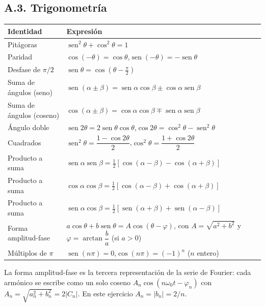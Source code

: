 \documentclass[11pt,a4paper]{article}
\DeclareMathOperator{\sen}{sen}
\begin{document}
\subsection*{A.3. Trigonometría}
\begin{table}[H]
\centering
\renewcommand{\arraystretch}{1.5}
\begin{tabularx}{\textwidth}{>{\raggedright\arraybackslash}p{4.4cm}X}
\toprule
\textbf{Identidad} & \textbf{Expresión}\\
\midrule
Pitágoras & $\sen^{2}\theta+\cos^{2}\theta=1$\\
Paridad & $\cos(-\theta)=\cos\theta$,\quad $\sen(-\theta)=-\sen\theta$\\
Desfase de $\pi/2$ & $\sen\theta=\cos\!\left(\theta-\tfrac{\pi}{2}\right)$\\
Suma de ángulos (seno) & $\sen(\alpha\pm\beta)=\sen\alpha\cos\beta\pm\cos\alpha\sen\beta$\\
Suma de ángulos (coseno) & $\cos(\alpha\pm\beta)=\cos\alpha\cos\beta\mp\sen\alpha\sen\beta$\\
Ángulo doble & $\sen2\theta=2\sen\theta\cos\theta$,\quad $\cos2\theta=\cos^{2}\theta-\sen^{2}\theta$\\
Cuadrados & $\sen^{2}\theta=\dfrac{1-\cos2\theta}{2}$,\quad $\cos^{2}\theta=\dfrac{1+\cos2\theta}{2}$\\
Producto a suma & $\sen\alpha\sen\beta=\tfrac{1}{2}[\cos(\alpha-\beta)-\cos(\alpha+\beta)]$\\
Producto a suma & $\cos\alpha\cos\beta=\tfrac{1}{2}[\cos(\alpha-\beta)+\cos(\alpha+\beta)]$\\
Producto a suma & $\sen\alpha\cos\beta=\tfrac{1}{2}[\sen(\alpha+\beta)+\sen(\alpha-\beta)]$\\
Forma amplitud-fase & $a\cos\theta+b\sen\theta=A\cos(\theta-\varphi)$, con
  $A=\sqrt{a^{2}+b^{2}}$ y $\varphi=\arctan\dfrac{b}{a}$ (si $a>0$)\\
Múltiplos de $\pi$ & $\sen(n\pi)=0$,\quad $\cos(n\pi)=(-1)^{n}$ ($n$ entero)\\
\bottomrule
\end{tabularx}
\end{table}
La forma amplitud-fase es la tercera representación de la serie de Fourier: cada armónico
se escribe como un solo coseno $A_n\cos(n\omega_0t-\varphi_n)$ con
$A_n=\sqrt{a_n^{2}+b_n^{2}}=2|C_n|$. En este ejercicio $A_n=|b_n|=2/n$.
\end{document}
